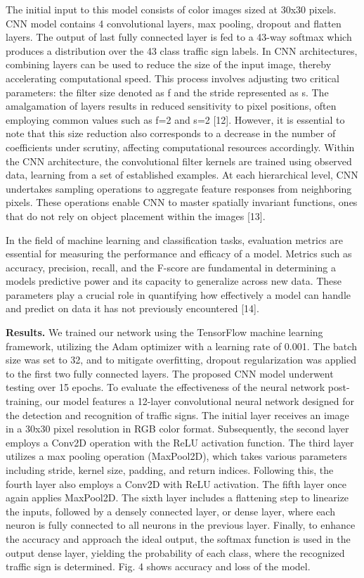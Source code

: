 The initial input to this model consists of color images sized at 30x30
pixels. CNN model contains 4 convolutional layers, max pooling, dropout
and flatten layers. The output of last fully connected layer is fed to a
43-way softmax which produces a distribution over the 43 class traffic
sign labels. In CNN architectures, combining layers can be used to
reduce the size of the input image, thereby accelerating computational
speed. This process involves adjusting two critical parameters: the
filter size denoted as \textquotesingle f\textquotesingle{} and the
stride represented as \textquotesingle s.\textquotesingle{} The
amalgamation of layers results in reduced sensitivity to pixel
positions, often employing common values such as f=2 and s=2 {[}12{]}.
However, it is essential to note that this size reduction also
corresponds to a decrease in the number of coefficients under scrutiny,
affecting computational resources accordingly. Within the CNN
architecture, the convolutional filter kernels are trained using
observed data, learning from a set of established examples. At each
hierarchical level, CNN undertakes sampling operations to aggregate
feature responses from neighboring pixels. These operations enable CNN
to master spatially invariant functions, ones that do not rely on object
placement within the images {[}13{]}.

In the field of machine learning and classification tasks, evaluation
metrics are essential for measuring the performance and efficacy of a
model. Metrics such as accuracy, precision, recall, and the F-score are
fundamental in determining a model\textquotesingle s predictive power
and its capacity to generalize across new data. These parameters play a
crucial role in quantifying how effectively a model can handle and
predict on data it has not previously encountered {[}14{]}.

{\bfseries Results.} We trained our network using the TensorFlow machine
learning framework, utilizing the Adam optimizer with a learning rate of
0.001. The batch size was set to 32, and to mitigate overfitting,
dropout regularization was applied to the first two fully connected
layers. The proposed CNN model underwent testing over 15 epochs. To
evaluate the effectiveness of the neural network post-training, our
model features a 12-layer convolutional neural network designed for the
detection and recognition of traffic signs. The initial layer receives
an image in a 30x30 pixel resolution in RGB color format. Subsequently,
the second layer employs a Conv2D operation with the ReLU activation
function. The third layer utilizes a max pooling operation (MaxPool2D),
which takes various parameters including stride, kernel size, padding,
and return indices. Following this, the fourth layer also employs a
Conv2D with ReLU activation. The fifth layer once again applies
MaxPool2D. The sixth layer includes a flattening step to linearize the
inputs, followed by a densely connected layer, or dense layer, where
each neuron is fully connected to all neurons in the previous layer.
Finally, to enhance the accuracy and approach the ideal output, the
softmax function is used in the output dense layer, yielding the
probability of each class, where the recognized traffic sign is
determined. Fig. 4 shows accuracy and loss of the model.

